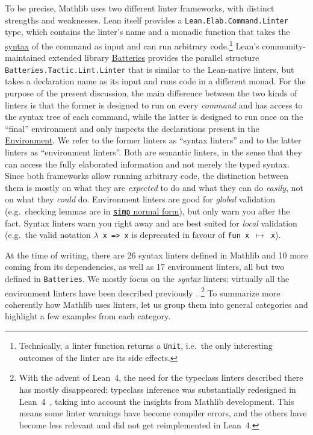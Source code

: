 \documentclass[runningheads]{llncs}
\def\Mathlib{Mathlib\xspace}
\def\mathlib{Mathlib\xspace}
\newcommand{\lean}[1]{\texttt{#1}}
\begin{document}
To be precise, \Mathlib uses two different linter frameworks, with distinct strengths and weaknesses.
Lean itself provides a \lean{Lean.Elab.Command.Linter} type, which contains the linter's name and a monadic function that takes the \href{https://lean-lang.org/doc/reference/latest//Notations-and-Macros/Defining-New-Syntax}{syntax} of the command as input and can run arbitrary code.\footnote{Technically, a linter function returns a \lean{Unit}, i.e.\ the only interesting outcomes of the linter are its side effects.}
Lean's community-maintained extended library \href{https://github.com/leanprover-community/batteries}{Batteries} provides the parallel structure\\\lean{Batteries.Tactic.Lint.Linter} that is similar to the Lean-native linters, but takes a declaration name as its input and runs code in a different monad.
For the purpose of the present discussion, the main difference between the two kinds of linters is that the former is designed to run on every {\emph{command}} and has access to the syntax tree of each command, while the latter is designed to run once on the ``final'' environment and only inspects the declarations present in the \href{https://leanprover-community.github.io/mathlib4_docs/Lean/Environment.html#Lean.Environment}{Environment}.
We refer to the former linters as ``syntax linters'' and to the latter linters as ``environment linters''. Both are semantic linters, in the sense that they can access the fully elaborated information and not merely the typed syntax.
Since both frameworks allow running arbitrary code, the distinction between them is mostly on what they are {\emph{expected}} to do and what they can do {\emph{easily}}, not on what they {\emph{could}} do.
Environment linters are good for {\emph{global}} validation (e.g.\ checking lemmas are in \href{https://lean-lang.org/doc/reference/latest/The-Simplifier/Simp-Normal-Forms/#simp-normal-forms}{\lean{simp} normal form}), but only warn you after the fact.
Syntax linters warn you right away and are best suited for {\emph{local}} validation (e.g.\ the valid notation \texttt{$\lambda$ x => x} is deprecated in favour of \texttt{fun x $\mapsto$ x}).

At the time of writing, there are 26 syntax linters defined in \mathlib and 10 more coming from its dependencies, as well as 17 environment linters, all but two defined in \verb|Batteries|.
We mostly focus on the \emph{syntax} linters: virtually all the environment linters have been described previously \cite{VanDoornEbnerLewis20}.%
\footnote{With the advent of Lean~4, the need for the typeclass linters described there has mostly disappeared: typeclass inference was substantially redesigned in Lean~4~\cite{SelsamUllrichDeMoura20}, taking into account the insights from \mathlib development. This means some linter warnings have become compiler errors, and the others have become less relevant and did not get reimplemented in Lean~4.}
To summarize more coherently how \mathlib uses linters, let us group them into general categories and highlight a few examples from each category.
\end{document}
